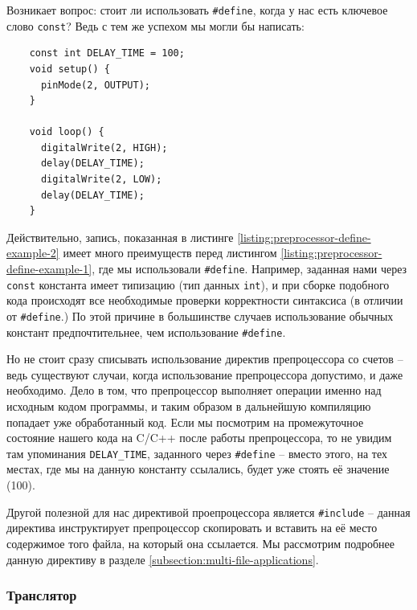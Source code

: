 \documentclass[../sparc.tex]{subfiles}
\begin{document}
Возникает вопрос: стоит ли использовать \texttt{#define}, когда у нас
есть ключевое слово \texttt{const}?  Ведь с тем же успехом мы могли бы
написать:

\begin{listing}[H]
  \begin{verbatim}
    const int DELAY_TIME = 100;
    void setup() {
      pinMode(2, OUTPUT);
    }

    void loop() {
      digitalWrite(2, HIGH);
      delay(DELAY_TIME);
      digitalWrite(2, LOW);
      delay(DELAY_TIME);
    }
  \end{verbatim}
  \label{listing:preprocessor-define-example-2}
  \caption{Пример задания обычной константы.}
\end{listing}

Действительно, запись, показанная в листинге
\ref{listing:preprocessor-define-example-2} имеет много преимуществ перед
листингом \ref{listing:preprocessor-define-example-1}, где мы использовали
\texttt{#define}.  Например, заданная нами через
\texttt{const} константа имеет типизацию (тип данных
\texttt{int}), и при сборке подобного кода происходят все необходимые
проверки корректности синтаксиса (в отличии от \texttt{#define}.)  По
этой причине в большинстве случаев использование обычных констант
предпочтительнее, чем использование \texttt{#define}.

Но не стоит сразу списывать использование директив препроцессора со счетов --
ведь существуют случаи, когда использование препроцессора допустимо, и даже
необходимо.  Дело в том, что препроцессор выполняет операции именно над исходным
кодом программы, и таким образом в дальнейшую компиляцию попадает уже
обработанный код.  Если мы посмотрим на промежуточное состояние нашего кода на
C/C++ после работы препроцессора, то не увидим там упоминания
\texttt{DELAY_TIME}, заданного через \texttt{#define} -- вместо
этого, на тех местах, где мы на данную константу ссылались, будет уже стоять её
значение (100).

Другой полезной для нас директивой проепроцессора является
\texttt{#include} -- данная директива инструктирует препроцессор
скопировать и вставить на её место содержимое того файла, на который она
ссылается.  Мы рассмотрим подробнее данную директиву в разделе
\ref{subsection:multi-file-applications}.

\subsubsection{Транслятор}
\end{document}
